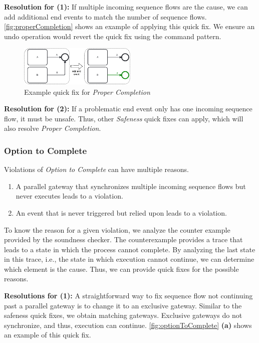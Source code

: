\documentclass[runningheads]{llncs}
\begin{document}
\textbf{Resolution for (1):} If multiple incoming sequence flows are the cause, we can add additional end events to match the number of sequence flows.
\autoref{fig:properCompletion} shows an example of applying this quick fix.
We ensure an undo operation would revert the quick fix using the command pattern.

\begin{figure}[ht]
	\centering
	\includegraphics[width=0.5\textwidth]{images/properCompletion}
	\caption{Example quick fix for \textit{Proper Completion}}
	\label{fig:properCompletion}
\end{figure}

\textbf{Resolution for (2):} If a problematic end event only has one incoming sequence flow, it must be unsafe.
Thus, other \textit{Safeness} quick fixes can apply, which will also resolve \textit{Proper Completion}.


\subsubsection{Option to Complete}
Violations of \textit{Option to Complete} can have multiple reasons.

\begin{enumerate}
	\item A parallel gateway that synchronizes multiple incoming sequence flows but never executes leads to a violation.
	\item An event that is never triggered but relied upon leads to a violation.
\end{enumerate}

To know the reason for a given violation, we analyze the counter example provided by the soundness checker.
The counterexample provides a trace that leads to a state in which the process cannot complete.
By analyzing the last state in this trace, i.e., the state in which execution cannot continue, we can determine which element is the cause.
Thus, we can provide quick fixes for the possible reasons.

\textbf{Resolutions for (1):} A straightforward way to fix sequence flow not continuing past a parallel gateway is to change it to an exclusive gateway.
Similar to the safeness quick fixes, we obtain matching gateways.
Exclusive gateways do not synchronize, and thus, execution can continue.
\autoref{fig:optionToComplete} \textbf{(a)} shows an example of this quick fix.
\end{document}
